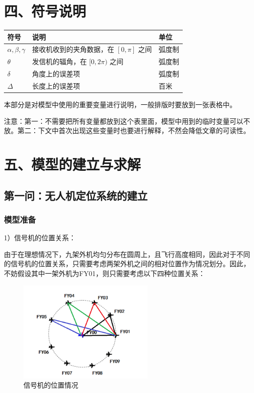 \documentclass{my_paper}
\begin{document}
\section{四、符号说明}
\begin{table}[h]%
    \centering
    \begin{tabular}{p{2.0cm}<{\centering}p{9.0cm}<{\centering}p{2.0cm}<{\centering}}
    \hline
    符号 & 说明 & 单位 \\ %
    \hline
    $\alpha,\beta,\gamma$ & 接收机收到的夹角数据，在 $[0,\pi]$ 之间 & 弧度制 \\ %
    $\theta$ & 发信机的辐角，在 $[0,2\pi)$ 之间 &  弧度制 \\ %
    $\delta$ & 角度上的误差项 & 弧度制 \\
    $\Delta$ & 长度上的误差项 & 百米 \\ %
    \hline
    \end{tabular}
\end{table}
本部分是对模型中使用的重要变量进行说明，一般排版时要放到一张表格中。

注意：第一：不需要把所有变量都放到这个表里面，模型中用到的临时变量可以不放。第二：下文中首次出现这些变量时也要进行解释，不然会降低文章的可读性。


\newpage

\section{五、模型的建立与求解}

\subsection{第一问：无人机定位系统的建立}
\subsubsection{模型准备}
1）信号机的位置关系：

由于在理想情况下，九架外机均匀分布在圆周上，且飞行高度相同，因此对于不同的信号机的位置关系，只需要考虑两架外机之间的相对位置作为情况划分。因此，不妨假设其中一架外机为FY01，则只需要考虑以下四种位置关系：

\begin{figure}[H]
    \centering
    \includegraphics[width=0.6\textwidth]{pic1.png}
    \caption{信号机的位置情况} 
\end{figure}
\end{document}
